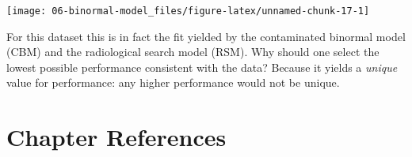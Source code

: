 \documentclass[
]{book}
\begin{document}
\begin{center}\texttt{[image: 06-binormal-model\_files/figure-latex/unnamed-chunk-17-1]} \end{center}

For this dataset this is in fact the fit yielded by the contaminated binormal model (CBM) and the radiological search model (RSM). Why should one select the lowest possible performance consistent with the data? Because it yields a \emph{unique} value for performance: any higher performance would not be unique.

\hypertarget{binormal-model-references}{%
\section{Chapter References}\label{binormal-model-references}}

  
\end{document}
